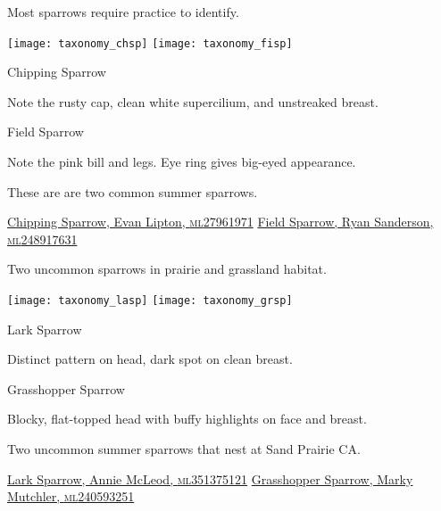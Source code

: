 \documentclass[t]{beamer}
\newcommand{\backoneline}{\vspace{-\baselineskip}}
\begin{document}
%



\begin{frame}{Most sparrows require practice to identify.}
	
	\texttt{[image: taxonomy\_chsp]}\hfill
	\texttt{[image: taxonomy\_fisp]}
	
	\backoneline
	
	\begin{multicols}{2}
		Chipping Sparrow
		
		\medskip
		
		Note the rusty cap, clean white supercilium, and unstreaked breast.
		
		\columnbreak
		
		Field Sparrow
		
		\medskip
		
		Note the pink bill and legs. Eye ring gives big-eyed appearance.
		
	\end{multicols}	
	
	These are are two common summer sparrows.
	
	\vfilll
	
	\tiny
	
	\href{https://macaulaylibrary.org/asset/27961971}{Chipping Sparrow, Evan Lipton, \textsc{ml}27961971} \hfill 
	\href{https://macaulaylibrary.org/asset/248917631}{Field Sparrow, Ryan Sanderson, \textsc{ml}248917631}
	
\end{frame}

%

\begin{frame}{Two uncommon sparrows in prairie and grassland habitat.}
	
	\texttt{[image: taxonomy\_lasp]}\hfill
	\texttt{[image: taxonomy\_grsp]}
	
	\backoneline
	
	\begin{multicols}{2}
		Lark Sparrow
		
		\medskip
		
		Distinct pattern on head, dark spot on clean breast.
		
		\columnbreak
		
		Grasshopper Sparrow
		
		\medskip
		
		Blocky, flat-topped head with buffy highlights on face and breast.
		
	\end{multicols}	
	
	Two uncommon summer sparrows that nest at Sand Prairie CA.
	
	\vfilll
	
	\tiny
	
	\href{https://macaulaylibrary.org/asset/351375121}{Lark Sparrow, Annie McLeod, \textsc{ml}351375121} \hfill 
	\href{https://macaulaylibrary.org/asset/240593251}{Grasshopper Sparrow, Marky Mutchler, \textsc{ml}240593251}
	
\end{frame}
\end{document}
